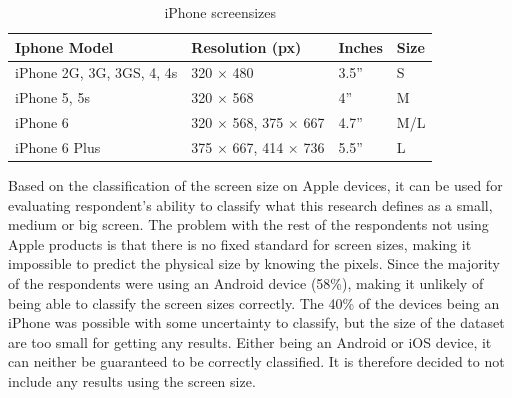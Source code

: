    \begin{table}[H]
      \centering
      \begin{tabular}{ l | l | l | l }
        \hline
        {\bf Iphone Model}  & {\bf Resolution (px)} & {\bf Inches} & {\bf Size} \\ \hline
        iPhone 2G, 3G, 3GS, 4, 4s  &  320 $\times$ 480  &  3.5'' & S\\
        iPhone 5, 5s        &  320 $\times$ 568  &  4'' & M \\
        iPhone 6            &  320 $\times$ 568, 375 $\times$ 667  &  4.7'' & M/L \\
        iPhone 6 Plus       &  375 $\times$ 667, 414 $\times$ 736  &  5.5'' & L \\ \hline        
      \end{tabular}
      \caption{iPhone screensizes}
      \label{tab:iphonescreen}
    \end{table}

    Based on the classification of the screen size on Apple devices, it can be used for evaluating respondent's ability to classify what this research defines as a small, medium or big screen. The problem with the rest of the respondents not using Apple products is that there is no fixed standard for screen sizes, making it impossible to predict the physical size by knowing the pixels. Since the majority of the respondents were using an Android device (58\%), making it unlikely of being able to classify the screen sizes correctly. The 40\% of the devices being an iPhone was possible with some uncertainty to classify, but the size of the dataset are too small for getting any results. Either being an Android or iOS device, it can neither be guaranteed to be correctly classified. It is therefore decided to not include any results using the screen size. 